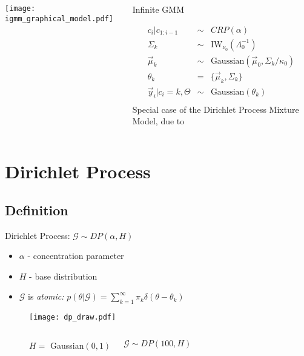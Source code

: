 \documentclass{beamer}
\begin{document}
\begin{frame}
\begin{columns}[top]
\begin{center}
		\texttt{[image: igmm\_graphical\_model.pdf]}
\end{center}
\begin{block}{Infinite GMM}

\begin{eqnarray*}
c_i|c_{1:i-1} & \sim & CRP(\alpha)\\
\Sigma_k & \sim & \text{IW}_{\nu_0}(\Lambda_0^{-1})\\
\vec{\mu}_k & \sim & \text{Gaussian}(\vec{\mu}_0,\Sigma_k/\kappa_0) \\
\theta_k &=& \{\vec \mu_k,\Sigma_k\} \\
\vec y_i | c_i=k, \Theta &\sim& \mbox{Gaussian}(\theta_k) \\
\end{eqnarray*}
{\tiny Special case of the Dirichlet Process Mixture Model, due to \cite{Rasmussen2000}}

\end{block}
\end{columns}
\end{frame}

\section{Dirichlet Process}
\subsection{Definition}
\begin{frame}
Dirichlet Process: $\mathcal{G} \sim DP(\alpha,H)$
\begin{itemize}
	\item{$\alpha$ - concentration parameter}
	\item{$H$ - base distribution}
	\item{$\mathcal{G}$ is {\em atomic:} $p(\theta|\mathcal{G}) = \displaystyle\sum_{k=1}^{\infty} \pi_k \delta(\theta-\theta_k)$}
\end{itemize}
\begin{figure}
\texttt{[image: dp\_draw.pdf]}
\begin{columns}[bottom]
\begin{center}
$H =$ Gaussian$(0,1)$
\end{center}
\begin{center}
$\mathcal{G} \sim DP(100,H)$
\end{center}
\end{columns}
\end{figure}
\end{frame}
\end{document}

